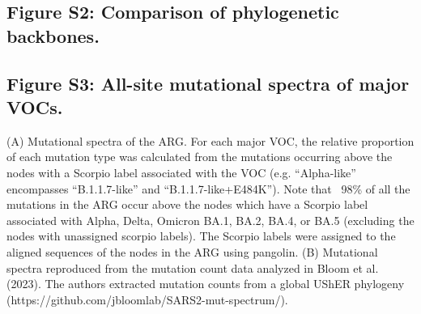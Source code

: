 \documentclass[12pt,letterpaper]{article}
\begin{document}

\subsection*{Figure S2: Comparison of phylogenetic backbones.}


\subsection*{Figure S3: All-site mutational spectra of major VOCs.}
(A) Mutational spectra of the ARG.
For each major VOC, the relative proportion of each mutation type was calculated from
the mutations occurring above the nodes with a Scorpio label associated with the VOC
(e.g. “Alpha-like” encompasses “B.1.1.7-like” and “B.1.1.7-like+E484K”).
Note that ~98\% of all the mutations in the ARG occur above the nodes
which have a Scorpio label associated with Alpha, Delta, Omicron BA.1, BA.2, BA.4, or BA.5
(excluding the nodes with unassigned scorpio labels).
The Scorpio labels were assigned to the aligned sequences of the nodes in the ARG using pangolin.
(B) Mutational spectra reproduced from the mutation count data analyzed in Bloom et al. (2023).
The authors extracted mutation counts from a global UShER phylogeny (https://github.com/jbloomlab/SARS2-mut-spectrum/).

\end{document}
